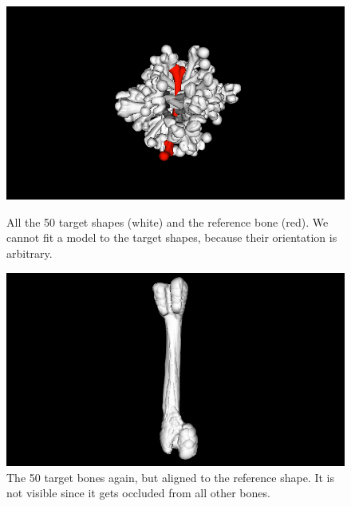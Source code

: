 \documentclass{article} %
\begin{document}
\begin{figure}[H]
	\begin{minipage}[t]{0.45\linewidth}
		\centering
		\includegraphics[width=.9\textwidth]{img/unaligned_bones.png}
		\caption{All the 50 target shapes (white) and the reference bone (red). We cannot fit a model to the target shapes, because their orientation is arbitrary.}
		\label{fig:unaligned_bones}
	\end{minipage}
	\hfill
	\begin{minipage}[t]{0.45\linewidth}
		\centering
		\includegraphics[width=.9\textwidth]{img/aligned_bones.png}
		\caption{The 50 target bones again, but aligned to the reference shape. It is not visible since it gets occluded from all other bones.}
		\label{fig:aligned_bones}
	\end{minipage}
\end{figure}
\end{document}
